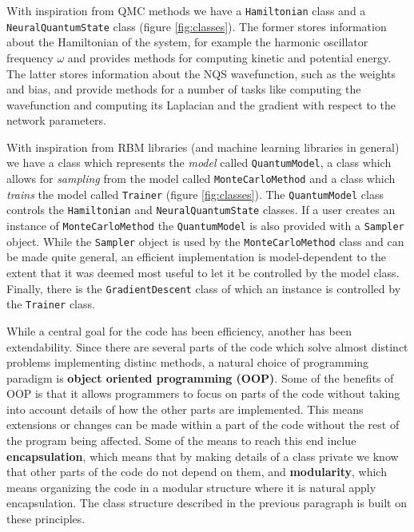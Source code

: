 \documentclass[twoside,english]{uiofysmaster}
\begin{document}
With inspiration from QMC methods we have a \texttt{Hamiltonian} class and a \texttt{NeuralQuantumState} class (figure \ref{fig:classes}). The former stores information about the Hamiltonian of the system, for example the harmonic oscillator frequency $\omega$ and provides methods for computing kinetic and potential energy. The latter stores information about the NQS wavefunction, such as the weights and bias, and provide methods for a number of tasks like computing the wavefunction and computing its Laplacian and the gradient with respect to the network parameters.

With inspiration from RBM libraries (and machine learning libraries in general) we have a class which represents the \textit{model} called \texttt{QuantumModel}, a class which allows for \textit{sampling} from the model called \texttt{MonteCarloMethod} and a class which \textit{trains} the model called \texttt{Trainer} (figure \ref{fig:classes}). The \texttt{QuantumModel} class controls the \texttt{Hamiltonian} and \texttt{NeuralQuantumState} classes. If a user creates an instance of \texttt{MonteCarloMethod} the \texttt{QuantumModel} is also provided with a \texttt{Sampler} object. While the \texttt{Sampler} object is used by the \texttt{MonteCarloMethod} class and can be made quite general, an efficient implementation is model-dependent to the extent that it was deemed most useful to let it be controlled by the model class. Finally, there is the \texttt{GradientDescent} class of which an instance is controlled by the \texttt{Trainer} class.

While a central goal for the code has been efficiency, another has been extendability. Since there are several parts of the code which solve almost distinct problems implementing distinc methods, a natural choice of programming paradigm is \textbf{object oriented programming (OOP)}. Some of the benefits of OOP is that it allows programmers to focus on parts of the code without taking into account details of how the other parts are implemented. This means extensions or changes can be made within a part of the code without the rest of the program being affected. Some of the means to reach this end inclue \textbf{encapsulation}, which means that by making details of a class private we know that other parts of the code do not depend on them, and \textbf{modularity}, which means organizing the code in a modular structure where it is natural apply encapsulation. The class structure described in the previous paragraph is built on these principles. 
\end{document}
